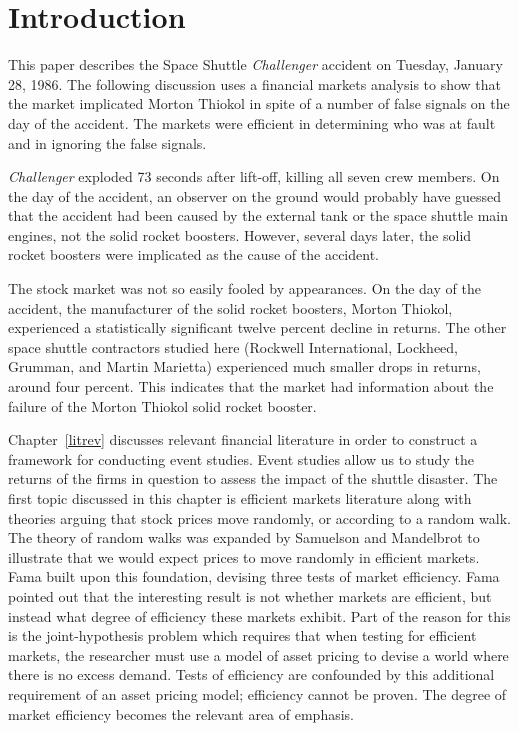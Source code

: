 \chapter{Introduction}

This paper describes the Space Shuttle {\em Challenger}
accident on Tuesday, January 28, 1986.
The following discussion uses a financial markets analysis
to show that the market implicated Morton Thiokol in spite
of a number of false signals on the day of the accident.
The markets were efficient in determining who was at fault
and in ignoring the false signals.

{\em Challenger} exploded 73 seconds after lift-off, killing
all seven crew members.
On the day of the accident, an observer on the ground would
probably have guessed that the accident had been caused by
the external tank or the space shuttle main engines, not the
solid rocket boosters.
However, several days later, the solid rocket boosters were
implicated as the cause of the accident.

The stock market was not so easily fooled by appearances. On
the day of the accident, the manufacturer of the solid
rocket boosters, Morton Thiokol, experienced a statistically
significant twelve
percent decline in returns.  The other space shuttle
contractors studied here (Rockwell International, Lockheed,
Grumman, and Martin Marietta)
experienced much smaller drops in returns, around four
percent.  This indicates that the market had information
about the failure of the Morton Thiokol
solid rocket booster.

Chapter~\ref{litrev} discusses relevant financial literature
in order to construct a framework for conducting event
studies.
Event studies allow us to study the returns of the firms in
question to assess the impact of the shuttle disaster.
The first topic discussed in this chapter is efficient
markets literature along with theories arguing that stock 
prices move randomly,
or according to a random walk.
The theory of random walks was expanded by Samuelson and Mandelbrot to
illustrate that we would expect prices to move randomly in
efficient markets.
Fama built upon this foundation, devising three tests of
market efficiency.
Fama pointed out that the interesting result is not
whether markets are efficient,
but instead what degree of efficiency these markets exhibit.
Part of the reason for this is the joint-hypothesis problem
which requires that when testing for efficient markets, the
researcher must use a model of asset pricing to devise a
world where there is no excess demand.
Tests of efficiency are confounded by this additional
requirement of an asset pricing model;  efficiency cannot be
proven.
The degree of market efficiency becomes the relevant area of
emphasis.

